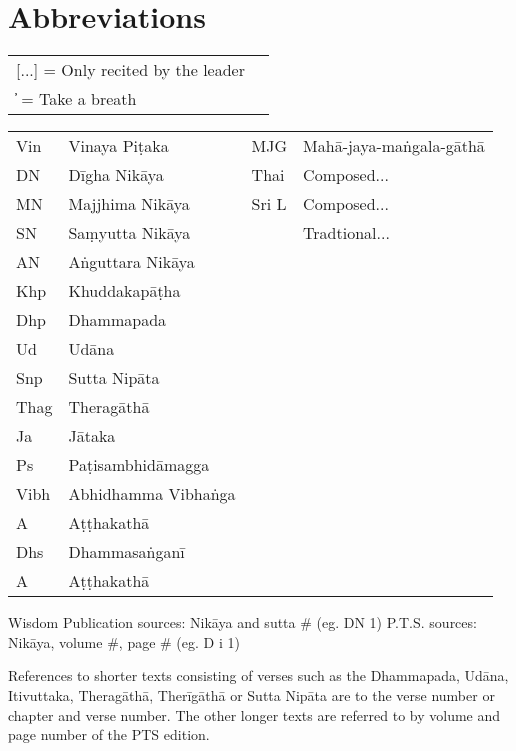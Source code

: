 \chapter{Abbreviations}

\thispagestyle{empty}

{}
\bigskip

{\raggedright
\fontsize{10}{14}\selectfont

\begin{tabular}{@{}ll@{}}
[...] = Only recited by the leader \\
̓     = Take a breath               \\
\end{tabular}

\begin{tabular}{@{}llll@{}}
  Vin  & Vinaya Piṭaka       & MJG   & Mahā-jaya-maṅgala-gāthā \\
  DN   & Dīgha Nikāya        & Thai  & Composed...             \\
  MN   & Majjhima Nikāya     & Sri L & Composed...             \\
  SN   & Saṃyutta Nikāya     &       & Tradtional...           \\
  AN   & Aṅguttara Nikāya    &       &                 \\
  Khp  & Khuddakapāṭha       &       &                 \\
  Dhp  & Dhammapada          &       &                 \\
  Ud   & Udāna               &       &                 \\
  Snp  & Sutta Nipāta        &       &                 \\
  Thag & Theragāthā          &       &                 \\
  Ja   & Jātaka              &       &                 \\
  Ps   & Paṭisambhidāmagga   &       &                 \\
  Vibh & Abhidhamma Vibhaṅga &       &                 \\
  A    & Aṭṭhakathā          &       &                 \\
  Dhs  & Dhammasaṅganī       &       &                 \\
  A    & Aṭṭhakathā          &       &                 \\

\end{tabular}

\bigskip

Wisdom Publication sources: Nikāya and sutta # (eg. DN 1)
P.T.S. sources: Nikāya, volume #, page # (eg. D i 1)

References to shorter texts consisting of verses such as the Dhammapada, Udāna,
Itivuttaka, Theragāthā, Therīgāthā or Sutta Nipāta are to the verse number or
chapter and verse number. The other longer texts are referred to by volume and
page number of the PTS edition.

}
